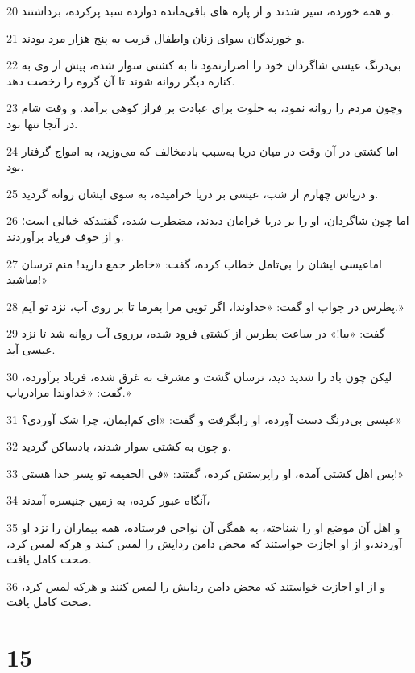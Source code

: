 \par 20 و همه خورده، سیر شدند و از پاره های باقی‌مانده دوازده سبد پرکرده، برداشتند.
\par 21 و خورندگان سوای زنان واطفال قریب به پنج هزار مرد بودند.
\par 22 بی‌درنگ عیسی شاگردان خود را اصرارنمود تا به کشتی سوار شده، پیش از وی به کناره دیگر روانه شوند تا آن گروه را رخصت دهد.
\par 23 وچون مردم را روانه نمود، به خلوت برای عبادت بر فراز کوهی برآمد. و وقت شام در آنجا تنها بود.
\par 24 اما کشتی در آن وقت در میان دریا به‌سبب بادمخالف که می‌وزید، به امواج گرفتار بود.
\par 25 و درپاس چهارم از شب، عیسی بر دریا خرامیده، به سوی ایشان روانه گردید.
\par 26 اما چون شاگردان، او را بر دریا خرامان دیدند، مضطرب شده، گفتندکه خیالی است؛ و از خوف فریاد برآوردند.
\par 27 اماعیسی ایشان را بی‌تامل خطاب کرده، گفت: «خاطر جمع دارید! منم ترسان مباشید!»
\par 28 پطرس در جواب او گفت: «خداوندا، اگر تویی مرا بفرما تا بر روی آب، نزد تو آیم.»
\par 29 گفت: «بیا!» در ساعت پطرس از کشتی فرود شده، برروی آب روانه شد تا نزد عیسی آید.
\par 30 لیکن چون باد را شدید دید، ترسان گشت و مشرف به غرق شده، فریاد برآورده، گفت: «خداوندا مرادریاب.»
\par 31 عیسی بی‌درنگ دست آورده، او رابگرفت و گفت: «ای کم‌ایمان، چرا شک آوردی؟»
\par 32 و چون به کشتی سوار شدند، بادساکن گردید.
\par 33 پس اهل کشتی آمده، او راپرستش کرده، گفتند: «فی الحقیقه تو پسر خدا هستی!»
\par 34 آنگاه عبور کرده، به زمین جنیسره آمدند،
\par 35 و اهل آن موضع او را شناخته، به همگی آن نواحی فرستاده، همه بیماران را نزد او آوردند،و از او اجازت خواستند که محض دامن ردایش را لمس کنند و هر‌که لمس کرد، صحت کامل یافت.
\par 36 و از او اجازت خواستند که محض دامن ردایش را لمس کنند و هر‌که لمس کرد، صحت کامل یافت.

\chapter{15}

